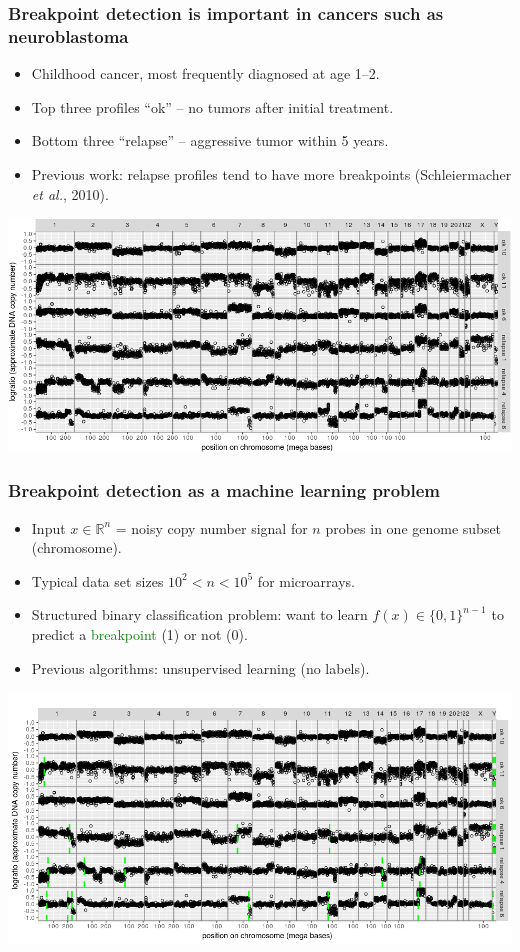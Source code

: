 \documentclass{beamer}
\begin{document}
\begin{frame}
  \frametitle{Breakpoint detection is important in cancers such as
    neuroblastoma } 

  \begin{itemize}
  \item Childhood cancer, most frequently diagnosed at age 1--2.
  \item Top three profiles ``ok'' -- no tumors after initial treatment.
  \item Bottom three ``relapse'' -- aggressive tumor within 5 years.
  \item Previous work: relapse profiles tend to have more breakpoints
     (Schleiermacher {\it et al.}, 2010).
  \end{itemize}

  \includegraphics[width=\textwidth]{neuroblastoma-ok-relapse}
\end{frame}

\begin{frame}
  \frametitle{Breakpoint detection as a machine learning problem}
  
  \begin{itemize}
  \item Input $x\in\mathbb R^n$ = noisy copy number signal for $n$
    probes in one genome subset (chromosome).
  \item Typical data set sizes $10^2 < n < 10^5$ for microarrays.
  \item Structured binary classification problem: want to learn
    $f(x)\in\{0,1\}^{n-1}$ to predict a 
    \textcolor{green}{breakpoint} (1) or not (0).
  \item Previous algorithms: unsupervised learning (no labels).
  \end{itemize}

  \includegraphics[width=\textwidth]{neuroblastoma-ok-relapse-pred}
\end{frame}
\end{document}
